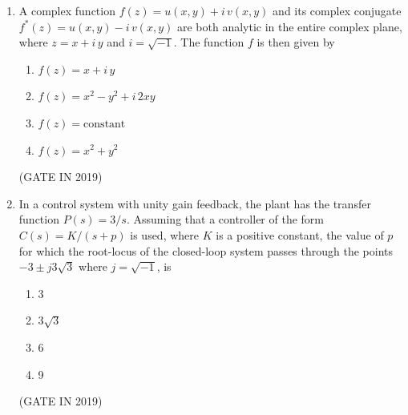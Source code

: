 \documentclass[journal]{IEEEtran}
\begin{document}
\begin{enumerate}
\item A complex function $f(z) = u(x, y) + i \, v(x, y)$ and its complex conjugate $f^*(z) = u(x, y) - i \, v(x, y)$ are both analytic in the entire complex plane, where $z = x + i \, y$ and $i = \sqrt{-1}$. The function $f$ is then given by
\begin{multicols}{2}
\begin{enumerate}
\item $f(z) = x + i \, y$
\item $f(z) = x^2 - y^2 + i \, 2xy$
\item $f(z) = \text{constant}$
\item $f(z) = x^2 + y^2$
\end{enumerate}
\end{multicols} \hfill(GATE IN 2019)

\item In a control system with unity gain feedback, the plant has the transfer function $P(s) = 3/s$. Assuming that a controller of the form $C(s) = K/(s + p)$ is used, where $K$ is a positive constant, the value of $p$ for which the root-locus of the closed-loop system passes through the points $-3 \pm j3\sqrt{3}$ where $j = \sqrt{-1}$, is
\begin{multicols}{4}
\begin{enumerate}
\item 3
\item $3\sqrt{3}$
\item 6
\item 9
\end{enumerate}
\end{multicols} \hfill(GATE IN 2019)


\end{enumerate}
\end{document}
